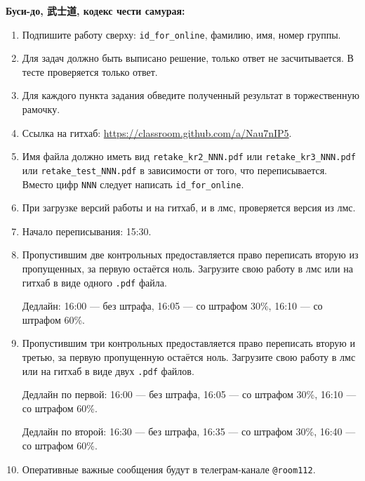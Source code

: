 \documentclass[12pt]{article}
\begin{document}
\vspace{20mm}

\textbf{Буси-до, 武士道, кодекс чести самурая:}

\vspace{5mm}

\begin{enumerate}  
\item Подпишите работу сверху: \verb|id_for_online|, фамилию, имя, номер группы.
\item Для задач должно быть выписано решение, только ответ не засчитывается. 
В тесте проверяется только ответ. 
\item Для каждого пункта задания обведите полученный результат в торжественную рамочку.

\item Ссылка на гитхаб: \url{https://classroom.github.com/a/Nau7nIP5}.

\item Имя файла должно иметь вид \verb|retake_kr2_NNN.pdf| или \verb|retake_kr3_NNN.pdf| 
или \verb|retake_test_NNN.pdf| в зависимости от того, что переписывается. 
Вместо цифр \verb|NNN| следует написать \verb|id_for_online|.

\item При загрузке версий работы и на гитхаб, и в лмс, проверяется версия из лмс. 
\item Начало переписывания: 15:30. 

\item Пропустившим две контрольных предоставляется право переписать вторую из пропущенных, 
  за первую остаётся ноль. 
  Загрузите свою работу в лмс или на гитхаб в виде одного \verb|.pdf| файла.
  
  Дедлайн: 16:00 — без штрафа, 16:05 — со штрафом 30\%, 16:10 — со штрафом 60\%. 
\item Пропустившим три контрольных предоставляется право переписать вторую и третью, 
  за первую пропущенную остаётся ноль. 
  Загрузите свою работу в лмс или на гитхаб в виде двух \verb|.pdf| файлов.
  
  Дедлайн по первой: 16:00 — без штрафа, 16:05 — со штрафом 30\%, 16:10 — со штрафом 60\%.
  
  Дедлайн по второй: 16:30 — без штрафа, 16:35 — со штрафом 30\%, 16:40 — со штрафом 60\%.


\item Оперативные важные сообщения будут в телеграм-канале \verb|@room112|.
\end{enumerate}
\end{document}

